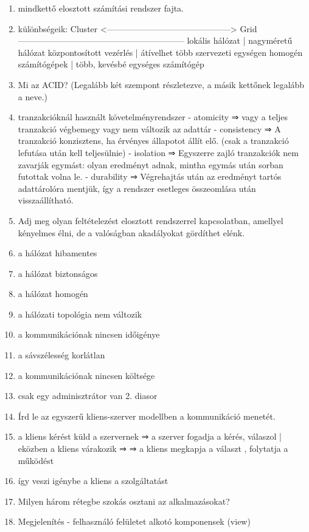 \documentclass[twoside, a4paper, 12pt]{article}
\begin{document}
\begin{enumerate}
    \item mindkettő elosztott számítási rendszer fajta.
    \item különbségeik:
        Cluster <--------------------------------------------> Grid
        -----------------------------------------------------------
        lokális hálózat	        | nagyméretű hálózat
        központosított vezérlés | átívelhet több szervezeti egységen
        homogén számítógépek	| több, kevésbé egységes számítógép
    \item  Mi az ACID? (Legalább két szempont részletezve, a másik kettőnek legalább a neve.)
    \item tranzakcióknál használt követelményrendszer
        - atomicity ⇒ vagy a teljes tranzakció végbemegy vagy nem változik az adattár
        - consistency ⇒ A tranzakció konzisztens, ha érvényes állapotot állít elő. (csak a tranzakció lefutása után kell teljesülnie)
        - isolation ⇒ Egyszerre zajló tranzakciók nem zavarják egymást: olyan eredményt adnak, mintha egymás után sorban futottak volna le.
        - durability ⇒ Végrehajtás után az eredményt tartós adattárolóra mentjük, így a rendszer esetleges összeomlása után visszaállítható.
    \item  Adj meg olyan feltételezést elosztott rendszerrel kapcsolatban, amellyel kényelmes élni, de a valóságban akadályokat gördíthet elénk.
    \item a hálózat hibamentes
    \item a hálózat biztonságos
    \item a hálózat homogén
    \item a hálózati topológia nem változik
    \item a kommunikációnak nincsen időigénye
    \item a sávszélesség korlátlan
    \item a kommunikációnak nincsen költsége
    \item csak egy adminisztrátor van
        2. diasor
    \item  Írd le az egyszerű kliens-szerver modellben a kommunikáció menetét.
    \item a kliens kérést küld a szervernek ⇒  a szerver fogadja a kérés, válaszol | eközben a kliens várakozik ⇒
        ⇒ 	a kliens megkapja a választ , folytatja a működést 
    \item így veszi igénybe a kliens a szolgáltatást
    \item  Milyen három rétegbe szokás osztani az alkalmazásokat?
    \item Megjelenítés - felhasználó felületet alkotó komponensek (view)

\end{enumerate}
\end{document}
